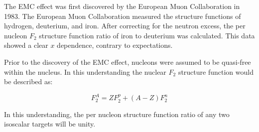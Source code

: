 The EMC effect was first discovered by the European Muon Collaboration in 1983. The European Muon Collaboration measured the structure functions of hydrogen, deuterium, and iron. After correcting for the neutron excess, the per nucleon $F_2$ structure function ratio of iron to deuterium was calculated. This data showed a clear $x$ dependence, contrary to expectations.

Prior to the discovery of the EMC effect, nucleons were assumed to be quasi-free within the nucleus. In this understanding the nuclear $F_2$ structure function would be described as:

\begin{equation}
	F_2^A = ZF_2^p + \left(A-Z\right)F_2^n
\end{equation}

In this understanding, the per nucleon structure function ratio of any two isoscalar targets will be unity.